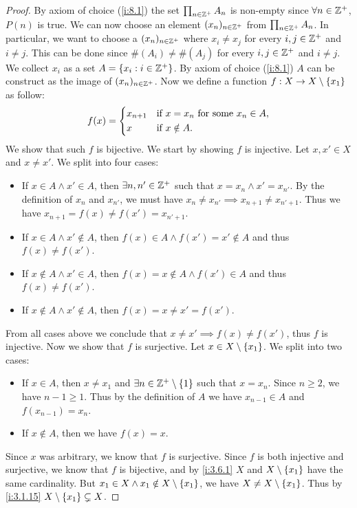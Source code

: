 \begin{proof}
  By axiom of choice (\cref{i:8.1}) the set \(\prod_{n \in \mathbb{Z}^+} A_n\) is non-empty since \(\forall n \in \mathbb{Z}^+\), \(P(n)\) is true.
  We can now choose an element \((x_n)_{n \in \mathbb{Z}^+}\) from \(\prod_{n \in \mathbb{Z}^+} A_n\).
  In particular, we want to choose a \((x_n)_{n \in \mathbb{Z}^+}\) where \(x_i \neq x_j\) for every \(i, j \in \mathbb{Z}^+\) and \(i \neq j\).
  This can be done since \(\#(A_i) \neq \#(A_j)\) for every \(i, j \in \mathbb{Z}^+\) and \(i \neq j\).
  We collect \(x_i\) as a set \(A = \left\lbrace x_i : i \in \mathbb{Z}^+\right\rbrace\).
  By axiom of choice (\cref{i:8.1}) \(A\) can be construct as the image of \((x_n)_{n \in \mathbb{Z}^+}\).
  Now we define a function \(f : X \to X \setminus \left\lbrace x_1\right\rbrace\) as follow:
  \[
    f(x) = \begin{dcases}
      x_{n + 1} & \text{if } x = x_n \text{ for some } x_n \in A, \\
      x         & \text{if } x \notin A.
    \end{dcases}
  \]
  We show that such \(f\) is bijective.
  We start by showing \(f\) is injective.
  Let \(x, x' \in X\) and \(x \neq x'\).
  We split into four cases:
  \begin{itemize}
    \item If \(x \in A \land x' \in A\), then \(\exists n, n' \in \mathbb{Z}^+\) such that \(x = x_n \land x' = x_{n'}\).
          By the definition of \(x_n\) and \(x_{n'}\), we must have \(x_n \neq x_{n'} \implies x_{n + 1} \neq x_{n' + 1}\).
          Thus we have \(x_{n + 1} = f(x) \neq f(x') = x_{n' + 1}\).
    \item If \(x \in A \land x' \notin A\), then \(f(x) \in A \land f(x') = x' \notin A\) and thus \(f(x) \neq f(x')\).
    \item If \(x \notin A \land x' \in A\), then \(f(x) = x \notin A \land f(x') \in A\) and thus \(f(x) \neq f(x')\).
    \item If \(x \notin A \land x' \notin A\), then \(f(x) = x \neq x' = f(x')\).
  \end{itemize}
  From all cases above we conclude that \(x \neq x' \implies f(x) \neq f(x')\), thus \(f\) is injective.
  Now we show that \(f\) is surjective.
  Let \(x \in X \setminus \left\lbrace x_1\right\rbrace\).
  We split into two cases:
  \begin{itemize}
    \item If \(x \in A\), then \(x \neq x_1\) and \(\exists n \in \mathbb{Z}^+ \setminus \left\lbrace1\right\rbrace\) such that \(x = x_n\).
          Since \(n \geq 2\), we have \(n - 1 \geq 1\).
          Thus by the definition of \(A\) we have \(x_{n - 1} \in A\) and \(f(x_{n - 1}) = x_n\).
    \item If \(x \notin A\), then we have \(f(x) = x\).
  \end{itemize}
  Since \(x\) was arbitrary, we know that \(f\) is surjective.
  Since \(f\) is both injective and surjective, we know that \(f\) is bijective, and by \cref{i:3.6.1} \(X\) and \(X \setminus \left\lbrace x_1\right\rbrace\) have the same cardinality.
  But \(x_1 \in X \land x_1 \notin X \setminus \left\lbrace x_1\right\rbrace\), we have \(X \neq X \setminus \left\lbrace x_1\right\rbrace\).
  Thus by \cref{i:3.1.15} \(X \setminus \left\lbrace x_1\right\rbrace \subsetneq X\).


\end{proof}
